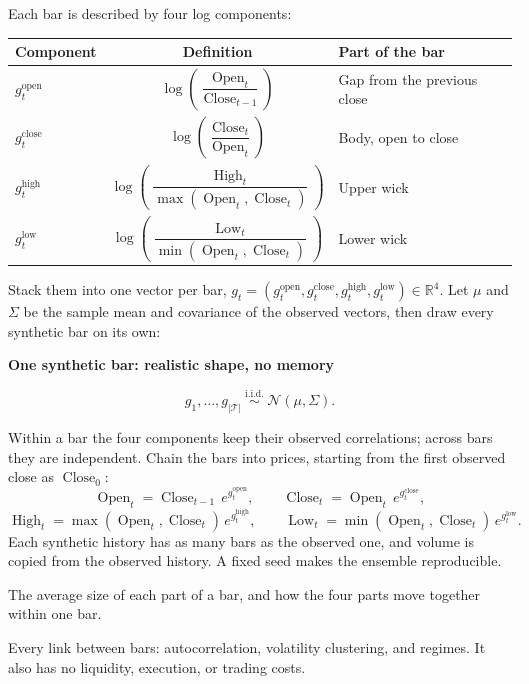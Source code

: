 \documentclass[11pt]{article}
\renewcommand{\arraystretch}{1.15}
\newenvironment{keyconcept}[1]{%
  \par\addvspace{8pt}\begin{lrbox}{\conceptbox}%
  \begin{minipage}{\dimexpr\linewidth-24pt\relax}%
  \setlength{\parindent}{0pt}%
  {\normalsize\bfseries\color{ConceptInk}#1\par}\large
}{%
  \end{minipage}\end{lrbox}%
  \noindent{\setlength{\fboxsep}{12pt}%
  \colorbox{ConceptPaper}{\usebox{\conceptbox}}}\par\addvspace{8pt}}
\DeclareMathOperator{\Close}{Close}
\DeclareMathOperator{\Open}{Open}
\DeclareMathOperator{\High}{High}
\DeclareMathOperator{\Low}{Low}
\begin{document}
Each bar is described by four log components:
\begin{center}
\large
\renewcommand{\arraystretch}{1.9}
\begin{tabular}{@{}l c l@{}}
\toprule
\rowcolor{ConceptPaper}
\textbf{Component} & \textbf{Definition} & \textbf{Part of the bar} \\
\midrule
$g^{\mathrm{open}}_t$ & $\log\left(\dfrac{\Open_t}{\Close_{t-1}}\right)$ & Gap from the previous close \\
$g^{\mathrm{close}}_t$ & $\log\left(\dfrac{\Close_t}{\Open_t}\right)$ & Body, open to close \\
$g^{\mathrm{high}}_t$ & $\log\left(\dfrac{\High_t}{\max(\Open_t,\Close_t)}\right)$ & Upper wick \\
$g^{\mathrm{low}}_t$ & $\log\left(\dfrac{\Low_t}{\min(\Open_t,\Close_t)}\right)$ & Lower wick \\
\bottomrule
\end{tabular}
\end{center}
Stack them into one vector per bar,
$g_t=(g^{\mathrm{open}}_t,g^{\mathrm{close}}_t,g^{\mathrm{high}}_t,g^{\mathrm{low}}_t)\in\mathbb R^4$.
Let $\mu$ and $\Sigma$ be the sample mean and covariance of the observed
vectors, then draw every synthetic bar on its own:
\begin{keyconcept}{One synthetic bar: realistic shape, no memory}
\[
 g_1,\ldots,g_{|\mathcal T|}\ \overset{\text{i.i.d.}}{\sim}\ \mathcal N(\mu,\Sigma).
\]
\end{keyconcept}
Within a bar the four components keep their observed correlations; across
bars they are independent. Chain the bars into prices, starting from the
first observed close as $\Close_0$:
\[
 \Open_t=\Close_{t-1}\,e^{g^{\mathrm{open}}_t},\qquad
 \Close_t=\Open_t\,e^{g^{\mathrm{close}}_t},
\]
\[
 \High_t=\max(\Open_t,\Close_t)\,e^{g^{\mathrm{high}}_t},\qquad
 \Low_t=\min(\Open_t,\Close_t)\,e^{g^{\mathrm{low}}_t}.
\]
Each synthetic history has as many bars as the observed one, and volume is
copied from the observed history. A fixed seed makes the ensemble
reproducible.
\begin{description}[font=\normalfont\large\bfseries\color{ConceptInk}]
 \item[What the null keeps] The average size of each part of a bar, and
       how the four parts move together within one bar.
 \item[What the null discards] Every link between bars: autocorrelation,
       volatility clustering, and regimes. It also has no liquidity,
       execution, or trading costs.
\end{description}
\end{document}
